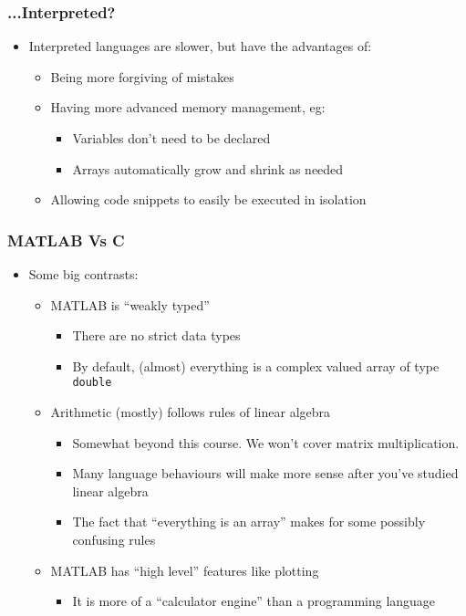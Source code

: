 \documentclass[14pt]{beamer}
\begin{document}
\begin{frame}
\frametitle{...Interpreted?}
\begin{itemize}
\item Interpreted languages are slower, but have the advantages of:
	\begin{itemize}
		\item Being more forgiving of mistakes
		\item Having more advanced memory management, eg:
			\begin{itemize}
				\item Variables don't need to be declared
				\item Arrays automatically grow and shrink as needed
			\end{itemize}
		\item Allowing code snippets to easily be executed in isolation
	\end{itemize}
\end{itemize}
\end{frame}

\begin{frame}
\frametitle{MATLAB Vs C}
\begin{itemize}
\item Some big contrasts:
	\begin{itemize}
		\item MATLAB is ``weakly typed''
			\begin{itemize}
				\item There are no strict data types
				\item By default, (almost) everything is a complex valued array of type \texttt{double}
			\end{itemize}
		\item Arithmetic (mostly) follows rules of linear algebra
			\begin{itemize}
				\item Somewhat beyond this course. We won't cover matrix multiplication.
				\item Many language behaviours will make more sense after you've studied linear algebra
				\item The fact that ``everything is an array'' makes for some possibly confusing rules
			\end{itemize}
		\item MATLAB has ``high level'' features like plotting
			\begin{itemize}
				\item It is more of a ``calculator engine'' than a programming language
			\end{itemize}
	\end{itemize}
\end{itemize}
\end{frame}
\end{document}
